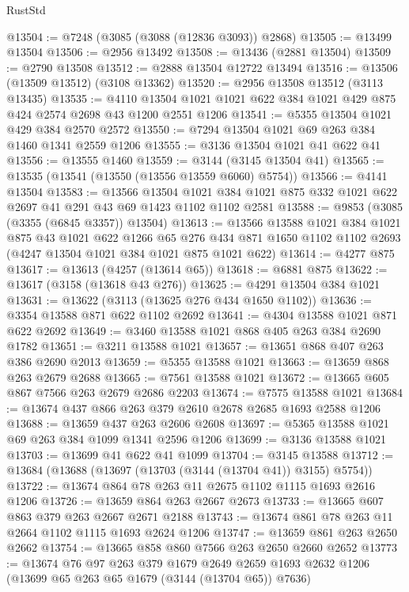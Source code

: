 \begin{lexlean}{RustStd}
\begin{coremodule}
@13504 := @7248 (@3085 (@3088 (@12836 @3093)) @2868)
@13505 := @13499 @13504
@13506 := @2956 @13492
@13508 := @13436 (@2881 @13504)
@13509 := @2790 @13508
@13512 := @2888 @13504 @12722 @13494
@13516 := @13506 (@13509 @13512) (@3108 @13362)
@13520 := @2956 @13508 @13512 (@3113 @13435)
@13535 := @4110 @13504 @1021 @1021 @622 @384 @1021 @429 @875 @424 @2574 @2698 @43 @1200 @2551 @1206
@13541 := @5355 @13504 @1021 @429 @384 @2570 @2572
@13550 := @7294 @13504 @1021 @69 @263 @384 @1460 @1341 @2559 @1206
@13555 := @3136 @13504 @1021 @41 @622 @41
@13556 := @13555 @1460
@13559 := @3144 (@3145 @13504 @41)
@13565 := @13535 (@13541 (@13550 (@13556 @13559 @6060) @5754))
@13566 := @4141 @13504
@13583 := @13566
    @13504
    @1021
    @384
    @1021
    @875
    @332
    @1021
    @622
    @2697
    @41
    @291
    @43
    @69
    @1423
    @1102
    @1102
    @2581
@13588 := @9853 (@3085 (@3355 (@6845 @3357)) @13504)
@13613 := @13566
    @13588
    @1021
    @384
    @1021
    @875
    @43
    @1021
    @622
    @1266
    @65
    @276
    @434
    @871
    @1650
    @1102
    @1102
    @2693
    (@4247 @13504 @1021 @384 @1021 @875 @1021 @622)
@13614 := @4277 @875
@13617 := @13613 (@4257 (@13614 @65))
@13618 := @6881 @875
@13622 := @13617 (@3158 (@13618 @43 @276))
@13625 := @4291 @13504 @384 @1021
@13631 := @13622 (@3113 (@13625 @276 @434 @1650 @1102))
@13636 := @3354 @13588 @871 @622 @1102 @2692
@13641 := @4304 @13588 @1021 @871 @622 @2692
@13649 := @3460 @13588 @1021 @868 @405 @263 @384 @2690 @1782
@13651 := @3211 @13588 @1021
@13657 := @13651 @868 @407 @263 @386 @2690 @2013
@13659 := @5355 @13588 @1021
@13663 := @13659 @868 @263 @2679 @2688
@13665 := @7561 @13588 @1021
@13672 := @13665 @605 @867 @7566 @263 @2679 @2686 @2203
@13674 := @7575 @13588 @1021
@13684 := @13674 @437 @866 @263 @379 @2610 @2678 @2685 @1693 @2588 @1206
@13688 := @13659 @437 @263 @2606 @2608
@13697 := @5365 @13588 @1021 @69 @263 @384 @1099 @1341 @2596 @1206
@13699 := @3136 @13588 @1021
@13703 := @13699 @41 @622 @41 @1099
@13704 := @3145 @13588
@13712 := @13684 (@13688 (@13697 (@13703 (@3144 (@13704 @41)) @3155) @5754))
@13722 := @13674 @864 @78 @263 @11 @2675 @1102 @1115 @1693 @2616 @1206
@13726 := @13659 @864 @263 @2667 @2673
@13733 := @13665 @607 @863 @379 @263 @2667 @2671 @2188
@13743 := @13674 @861 @78 @263 @11 @2664 @1102 @1115 @1693 @2624 @1206
@13747 := @13659 @861 @263 @2650 @2662
@13754 := @13665 @858 @860 @7566 @263 @2650 @2660 @2652
@13773 := @13674
    @76
    @97
    @263
    @379
    @1679
    @2649
    @2659
    @1693
    @2632
    @1206
    (@13699 @65 @263 @65 @1679 (@3144 (@13704 @65)) @7636)

\end{coremodule}
\end{lexlean}
